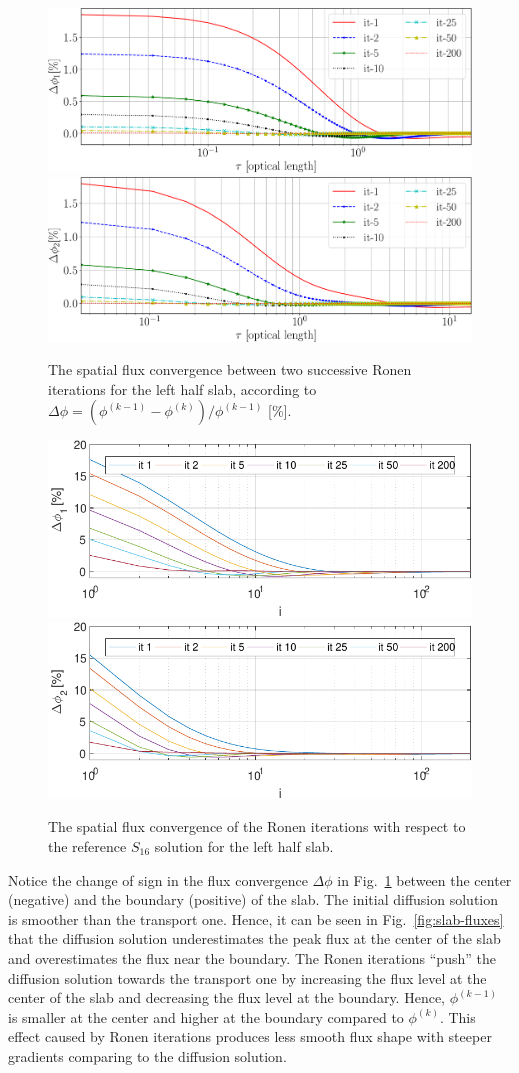 \begin{figure}[htbp]
	\centering
	\includegraphics[width=0.65\linewidth]{fast_flx_err_RM.pdf}
	\includegraphics[width=0.65\linewidth]{thermal_flx_err_RM.pdf}	%
	\caption{The spatial flux convergence between two successive Ronen iterations for the left half slab, according to $\Delta\phi = (\phi^{(k-1)}-\phi^{(k)})/\phi^{(k-1)}$ [\%].}
	\label{fig:conv2}
\end{figure}

\begin{figure}[hbtp]
	\centering
	\includegraphics[width=0.48\linewidth]{flux_deviation_half_it_1_sn.pdf}
	\includegraphics[width=0.48\linewidth]{flux_deviation_half_it_2_sn.pdf}
	\caption{The spatial flux convergence of the Ronen iterations with respect to the reference $S_{16}$ solution for the left half slab.}
	\label{fig:conv3}
\end{figure}

Notice the change of sign in the flux convergence $\Delta \phi$ in Fig.~\ref{fig:conv2} between the center (negative) and the boundary (positive) of the slab. The initial diffusion solution is smoother than the transport one. Hence, it can be seen in Fig.~\ref{fig:slab-fluxes} that the diffusion solution underestimates the peak flux at the center of the slab and overestimates the flux near the boundary. The Ronen iterations ``push'' the diffusion solution towards the transport one by increasing the flux level at the center of the slab and decreasing the flux level at the boundary. Hence, $\phi^{(k-1)}$ is smaller at the center and higher at the boundary compared to $\phi^{(k)}$. This effect caused by Ronen iterations produces less smooth flux shape with steeper gradients comparing to the diffusion solution.
%
